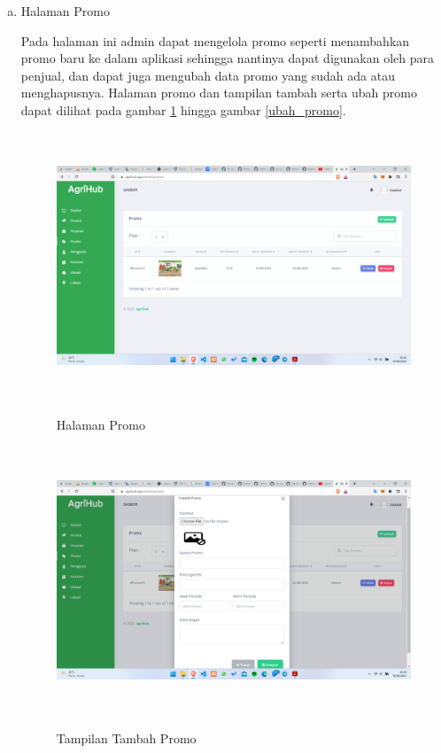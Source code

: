 \begin{enumerate}
\begin{enumerate}[a.]
		\item Halaman Promo
		\par Pada halaman ini admin dapat mengelola promo seperti menambahkan promo baru ke dalam aplikasi sehingga nantinya dapat digunakan oleh para penjual, dan dapat juga mengubah data promo yang sudah ada atau menghapusnya. Halaman promo dan tampilan tambah serta ubah promo dapat dilihat pada gambar \ref*{promo} hingga gambar \ref*{ubah_promo}.
		\begin{figure}[H]
			\centering
			{\includegraphics [width = 13.5cm, height= 8cm]{gambar/admin/promo}}
			\caption{Halaman Promo}
			\label{promo}
		\end{figure}
		\begin{figure}[H]
			\centering
			{\includegraphics [width = 13.5cm, height= 8cm]{gambar/admin/tambah_promo}}
			\caption{Tampilan Tambah Promo}
			\label{tambah_promo}
		\end{figure}
		\begin{figure}[H]
			\centering

\end{figure}
\end{enumerate}
\end{enumerate}
